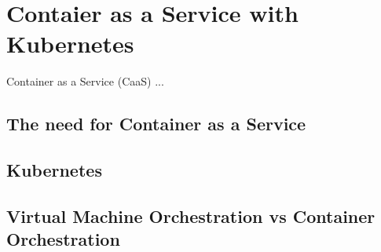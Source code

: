 \chapter{Contaier as a Service with Kubernetes}
\label{cha:caas}
Container as a Service (CaaS) ...

\section{The need for Container as a Service}
\label{sec:caas-need-for-caas}

\section{Kubernetes}
\label{sec:caas-kubernetes}

\section{Virtual Machine Orchestration vs Container Orchestration}
\label{sec:caas-vm-vs-container-orchestration}

